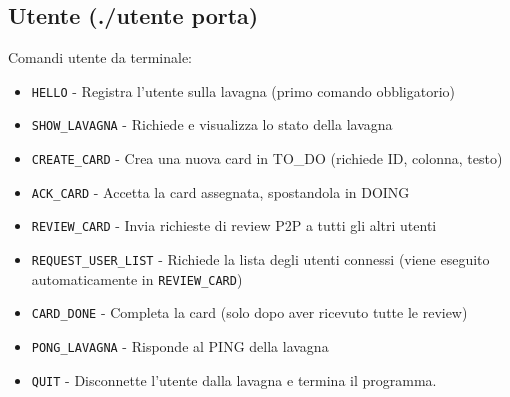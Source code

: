 \documentclass[a4paper,11pt]{article}
\begin{document}
\subsection*{Utente     (./utente porta)}
Comandi utente da terminale:
\begin{itemize}
    \item \texttt{HELLO} - Registra l'utente sulla lavagna (primo comando obbligatorio)
    \item \texttt{SHOW\_LAVAGNA} - Richiede e visualizza lo stato della lavagna
    \item \texttt{CREATE\_CARD} - Crea una nuova card in TO\_DO (richiede ID, colonna, testo)
    \item \texttt{ACK\_CARD} - Accetta la card assegnata, spostandola in DOING
    \item \texttt{REVIEW\_CARD} - Invia richieste di review P2P a tutti gli altri utenti 
    \item \texttt{REQUEST\_USER\_LIST} - Richiede la lista degli utenti connessi (viene eseguito automaticamente in \texttt{REVIEW\_CARD})
    \item \texttt{CARD\_DONE} - Completa la card (solo dopo aver ricevuto tutte le review)
    \item \texttt{PONG\_LAVAGNA} - Risponde al PING della lavagna
    \item \texttt{QUIT} - Disconnette l'utente dalla lavagna e termina il programma.
\end{itemize}
\end{document}
